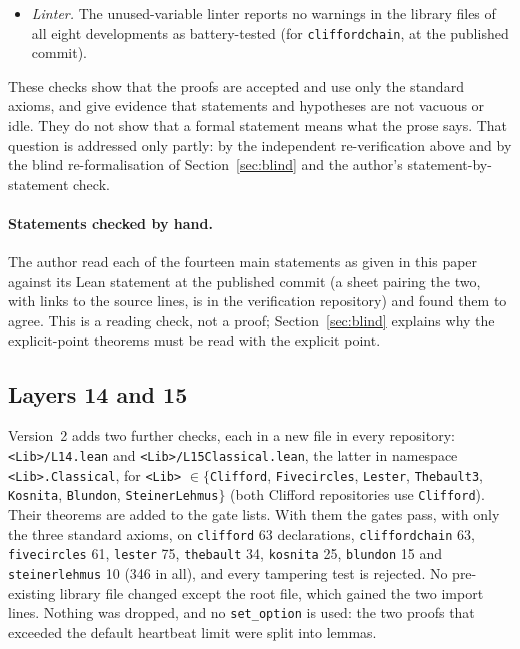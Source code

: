 \documentclass[11pt]{article}
\theoremstyle{definition}
\theoremstyle{remark}
\newcommand{\lean}[1]{\texttt{#1}}
\begin{document}
\begin{itemize}
(they carry a leading underscore for that reason). In \lean{clifford}, ,
 and  needed every binder (10, 20 and 41), but  did not need
five of its ten non-collinearity hypotheses (\lean{n135}, \lean{n145}, \lean{n235}, \lean{n245},
\lean{n345}; it has twenty hypotheses in all), the auxiliary lemma \lean{five\_NN} six of its, and \lean{ZD\_ne\_zero} four (all are
non-collinearity hypotheses for triples involving circle 5 or 6; we also confirmed the first two cases
by reading the proofs). These
theorems are stated under more hypotheses than their proofs use; they remain correct. A binder the
unchanged proof needs is not thereby shown to be logically necessary.
\item \emph{Linter.} The unused-variable linter reports no warnings in the library files of all eight
developments as battery-tested (for \lean{cliffordchain}, at the published commit).
\end{itemize}
These checks show that the proofs are accepted and use only the standard axioms, and give evidence
that statements and hypotheses are not vacuous or idle. They do not show that a formal statement means
what the prose says. That question is addressed only partly: by the independent re-verification above
and by the blind re-formalisation of Section~\ref{sec:blind} and the author's
statement-by-statement check.

\paragraph{Statements checked by hand.} The author read each of the fourteen main statements as given in
this paper against its Lean statement at the published commit (a sheet pairing the two, with links to
the source lines, is in the verification repository) and found them to agree. This is a reading check, not a
proof; Section~\ref{sec:blind} explains why the explicit-point theorems must be read with the explicit
point.

\subsection{Layers 14 and 15}\label{sec:l1415}
Version~2 adds two further checks, each in a new file in every repository: \lean{<Lib>/L14.lean} and
\lean{<Lib>/L15Classical.lean}, the latter in namespace \lean{<Lib>.Classical}, for
\lean{<Lib>} $\in\{$\lean{Clifford}, \lean{Fivecircles}, \lean{Lester}, \lean{Thebault3}, \lean{Kosnita},
\lean{Blundon}, \lean{SteinerLehmus}$\}$ (both Clifford repositories use \lean{Clifford}). Their theorems
are added to the gate lists. With them the gates pass, with only the three standard axioms, on
\lean{clifford} 63 declarations, \lean{cliffordchain} 63, \lean{fivecircles} 61, \lean{lester} 75,
\lean{thebault} 34, \lean{kosnita} 25, \lean{blundon} 15 and \lean{steinerlehmus} 10 (346 in all), and
every tampering test is rejected. No pre-existing library file changed except the root file, which gained the two import lines. Nothing was dropped, and no
\lean{set\_option} is used: the two proofs that exceeded the default heartbeat limit were split into
lemmas.
\end{document}
